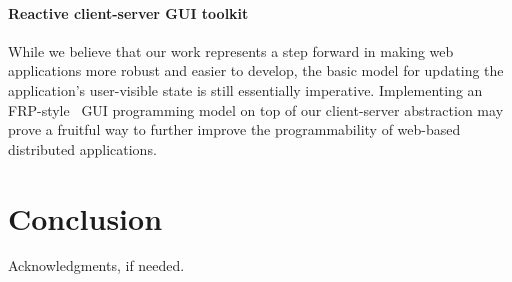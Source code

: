 \documentclass[preprint]{sigplanconf}
\begin{document}
\paragraph{Reactive client-server GUI toolkit} While we believe that our work
represents a step forward in making web applications more robust and easier to
develop, the basic model for updating the application's user-visible state is
still essentially imperative. Implementing an FRP-style\ \cite{ppfrp} GUI
programming model on top of our client-server abstraction may prove a fruitful
way to further improve the programmability of web-based distributed
applications.

\section{Conclusion}

\acks

Acknowledgments, if needed.




\end{document}
